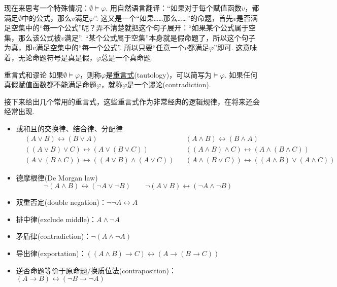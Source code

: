 \documentclass[main.tex]{subfiles}
\begin{document}
现在来思考一个特殊情况：\(\emptyset \vDash \varphi\). 用自然语言翻译：“如果对于每个赋值函数\(v\)，都满足\(\emptyset\)中的公式，那么\(v\)满足\(\varphi\)”. 这又是一个“如果……那么……”的命题，首先\(v\)是否满足空集中的“每一个公式”呢？弄不清楚就把这个句子展开：“如果某个公式属于空集，那么该公式被\(v\)满足”. “某个公式属于空集”本身就是假命题了，所以这个句子为真，即\(v\)满足空集中的“每一个公式”. 所以只要“任意一个\(v\)都满足\(\varphi\)”即可. 这意味着，无论命题符号是真是假，\(\varphi\)总是一个真命题.

\begin{definition}{重言式和谬论}
    如果\(\emptyset \vDash \varphi\)，则称\(\varphi\)是\uline{重言式}(tautology)，可以简写为\(\vDash \varphi\). \newline
    如果任何真假赋值函数都不能满足命题\(\varphi\)，就称\(\varphi\)是一个\uline{谬论}(contradiction).
\end{definition}

接下来给出几个常用的重言式，这些重言式作为非常经典的逻辑规律，在将来还会经常出现.
\begin{itemize}
    \item 或和且的交换律、结合律、分配律
    \begin{align*}
        & (A \vee B) \leftrightarrow (B \vee A) && (A \wedge B) \leftrightarrow (B \wedge A) \\
        & ((A \vee B) \vee C) \leftrightarrow (A \vee (B \vee C)) && ((A \wedge B) \wedge C) \leftrightarrow (A \wedge (B \wedge C)) \\
        & (A \vee (B \wedge C)) \leftrightarrow ((A \vee B) \wedge (A \vee C)) && (A \wedge (B \vee C)) \leftrightarrow ((A \wedge B) \vee (A \wedge C))
    \end{align*}
    \item 德摩根律(De Morgan law)
    \[\neg(A \wedge B) \leftrightarrow (\neg A \vee \neg B) \qquad \neg (A \vee B) \leftrightarrow (\neg A \wedge \neg B)\]
    \item 双重否定(double negation)：\(\neg \neg A \leftrightarrow A\)
    \item 排中律(exclude middle)：\(A \wedge \neg A\)
    \item 矛盾律(contradiction)：\(\neg (A \wedge \neg A)\)
    \item 导出律(exportation)：\(((A \wedge B) \to C) \leftrightarrow (A \to (B \to C))\)
    \item 逆否命题等价于原命题/换质位法(contraposition)：\((A \to B) \leftrightarrow (\neg B \to \neg A)\)
\end{itemize}
\end{document}
